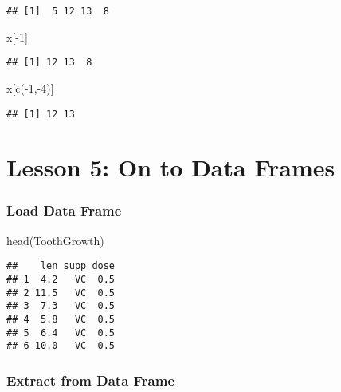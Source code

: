 \documentclass[
]{article}
\newenvironment{Shaded}{\begin{snugshade}}{\end{snugshade}}
\newcommand{\DecValTok}[1]{\textcolor[rgb]{0.00,0.00,0.81}{#1}}
\newcommand{\FunctionTok}[1]{\textcolor[rgb]{0.00,0.00,0.00}{#1}}
\newcommand{\NormalTok}[1]{#1}
\newcommand{\SpecialCharTok}[1]{\textcolor[rgb]{0.00,0.00,0.00}{#1}}
\begin{document}
\begin{verbatim}
## [1]  5 12 13  8
\end{verbatim}

\begin{Shaded}
\begin{Highlighting}[]
\NormalTok{x[}\SpecialCharTok{{-}}\DecValTok{1}\NormalTok{]}
\end{Highlighting}
\end{Shaded}

\begin{verbatim}
## [1] 12 13  8
\end{verbatim}

\begin{Shaded}
\begin{Highlighting}[]
\NormalTok{x[}\FunctionTok{c}\NormalTok{(}\SpecialCharTok{{-}}\DecValTok{1}\NormalTok{,}\SpecialCharTok{{-}}\DecValTok{4}\NormalTok{)]}
\end{Highlighting}
\end{Shaded}

\begin{verbatim}
## [1] 12 13
\end{verbatim}

\hypertarget{lesson-5-on-to-data-frames}{%
\section{Lesson 5: On to Data Frames}\label{lesson-5-on-to-data-frames}}

\hypertarget{load-data-frame}{%
\subsubsection{Load Data Frame}\label{load-data-frame}}

\begin{Shaded}
\begin{Highlighting}[]
\FunctionTok{head}\NormalTok{(ToothGrowth)}
\end{Highlighting}
\end{Shaded}

\begin{verbatim}
##    len supp dose
## 1  4.2   VC  0.5
## 2 11.5   VC  0.5
## 3  7.3   VC  0.5
## 4  5.8   VC  0.5
## 5  6.4   VC  0.5
## 6 10.0   VC  0.5
\end{verbatim}

\hypertarget{extract-from-data-frame}{%
\subsubsection{\texorpdfstring{\textbf{Extract from Data
Frame}}{Extract from Data Frame}}\label{extract-from-data-frame}}
\end{document}
